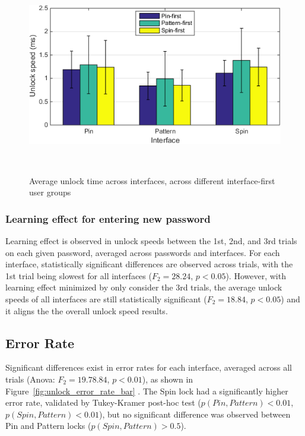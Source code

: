 \documentclass{sigchi}
\begin{document}
\begin{figure}[h]
  \centering
  \includegraphics[width=0.85\columnwidth]{figures/analysis_4_speed_bar.png}
  \caption{Average unlock time across interfaces, across different interface-first user groups}~\label{fig:analysis_4_speed_bar}
\end{figure}


\subsubsection{Learning effect for entering new password}
Learning effect is observed in unlock speeds between the 1st, 2nd, and 3rd trials on each given password, averaged across passwords and interfaces. For each interface, statistically significant differences are observed across trials, with the 1st trial being slowest for all interfaces ($F_{2} = 28.24$, $p<0.05$). However, with learning effect minimized by only consider the 3rd trials, the average unlock speeds of all interfaces are still statistically significant ($F_{2} = 18.84$, $p<0.05$) and it aligns the the overall unlock speed results. 

\subsection{Error Rate}
Significant differences exist in error rates for each interface, averaged across all trials (Anova: $F_{2} = 19.78.84$, $p<0.01$), as shown in Figure~\ref{fig:unlock_error_rate_bar} . The Spin lock had a significantly higher error rate, validated by Tukey-Kramer post-hoc test ($p(Pin, Pattern) < 0.01 $, $p(Spin,Pattern)< 0.01$), but no significant difference was observed between Pin and Pattern locks ($p(Spin,Pattern)> 0.5$).  

\end{document}
